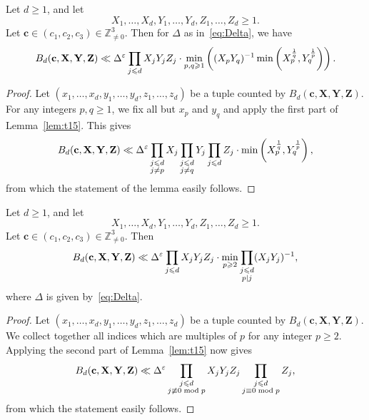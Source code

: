 \begin{proposition}\label{prop:DeterminantMethod}
Let $d\geq 1$, and let
\[
X_1,\ldots, X_d, Y_1,\ldots, Y_d,Z_1,\ldots, Z_d\geq 1.
\]
Let $\mathbf{c}\in (c_1,c_2,c_3)\in \mathbb{Z}_{\neq 0}^3$.
Then for $\Delta$ as in~\eqref{eq:Delta}, we have
\[
B_d(\mathbf{c},\mathbf{X},\mathbf{Y},\mathbf{Z}) \ll
\Delta^\varepsilon \prod_{j\leqslant d} X_j Y_j Z_j \cdot
\min_{p,q\geqslant 1}\left(
(X_p Y_q)^{-1}
\min\left( X_p^{\frac{1}{q}} , Y_q^{\frac{1}{p}}\right)\right).
\]
\end{proposition}


\begin{proof}
Let $(x_1,\ldots, x_d,y_1,\ldots, y_d,z_1,\ldots, z_d)$ be a tuple counted by $B_d(\mathbf{c},\mathbf{X},\mathbf{Y},\mathbf{Z})$.
For any integers $p,q\geq 1$, we fix all but $x_p$ and $y_q$ and apply
the first part of Lemma~\ref{lem:t15}. This gives
\[
B_d(\mathbf{c},\mathbf{X},\mathbf{Y},\mathbf{Z}) \ll
\Delta^\varepsilon \prod_{\substack{j\leqslant d\\ j\neq p }} X_j
\prod_{\substack{j\leqslant d\\ j\neq q }} Y_j
\prod_{\substack{j\leqslant d }} Z_j \cdot
\min\left( X_p^{\frac{1}{q}} , Y_q^{\frac{1}{p}}\right) ,
\]
from which the statement of the lemma easily follows.
\end{proof}





\begin{proposition}\label{prop:ThueEquations}
Let $d\geq 1$, and let
\[
X_1,\ldots, X_d, Y_1,\ldots, Y_d,Z_1,\ldots, Z_d\geq 1.
\]
Let $\mathbf{c}\in (c_1,c_2,c_3)\in \mathbb{Z}_{\neq 0}^3$.
Then
\[
B_d(\mathbf{c},\mathbf{X},\mathbf{Y},\mathbf{Z}) \ll
\Delta^\varepsilon \prod_{j\leqslant d} X_j Y_j Z_j \cdot
\min_{p\geqslant 2}
\prod_{\substack{j\leqslant d \\ p\mid j}} (X_j Y_j)^{-1},
\]
where $\Delta$ is given by~\eqref{eq:Delta}.
\end{proposition}


\begin{proof}
Let $(x_1,\ldots, x_d,y_1,\ldots, y_d,z_1,\ldots, z_d)$ be a tuple counted by $B_d(\mathbf{c},\mathbf{X},\mathbf{Y},\mathbf{Z})$.
We collect together all indices which are multiples of $p$ for any integer $p\geq 2$.
Applying the second part of Lemma~\ref{lem:t15} now gives
\[
B_d(\mathbf{c},\mathbf{X},\mathbf{Y},\mathbf{Z}) \ll
\Delta^\varepsilon \prod_{\substack{j\leqslant d\\ j\not\equiv 0 \bmod{p} }} X_j Y_j Z_j
 \prod_{\substack{j\leqslant d\\ j\equiv 0 \bmod{p} }} Z_j,
\]
from which the statement easily follows.
\end{proof}



